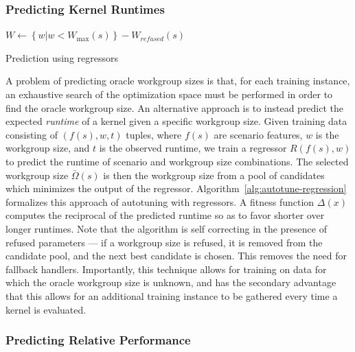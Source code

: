 \subsubsection{Predicting Kernel Runtimes}

\begin{algorithm}[t]
  \SetAlgoLined

  $W \leftarrow \left\{ w | w < W_{\max}(s) \right\} - W_{refused}(s)$\;
\caption{Prediction using regressors}
\label{alg:autotune-regression}
\end{algorithm}

A problem of predicting oracle workgroup sizes is that, for each
training instance, an exhaustive search of the optimization space must
be performed in order to find the oracle workgroup size. An
alternative approach is to instead predict the expected \emph{runtime}
of a kernel given a specific workgroup size. Given training data
consisting of $(f(s),w,t)$ tuples, where $f(s)$ are scenario features,
$w$ is the workgroup size, and $t$ is the observed runtime, we train a
regressor $R(f(s), w)$ to predict the runtime of scenario and
workgroup size combinations. The selected workgroup size
$\bar{\Omega}(s)$ is then the workgroup size from a pool of candidates
which minimizes the output of the
regressor. Algorithm~\ref{alg:autotune-regression} formalizes this
approach of autotuning with regressors. A fitness function $\Delta(x)$
computes the reciprocal of the predicted runtime so as to favor
shorter over longer runtimes. Note that the algorithm is self
correcting in the presence of refused parameters --- if a workgroup
size is refused, it is removed from the candidate pool, and the next
best candidate is chosen. This removes the need for fallback
handlers. Importantly, this technique allows for training on data for
which the oracle workgroup size is unknown, and has the secondary
advantage that this allows for an additional training instance to be
gathered every time a kernel is evaluated.


\subsubsection{Predicting Relative Performance}

